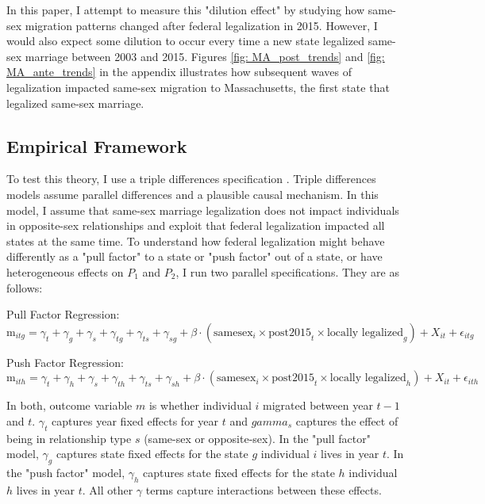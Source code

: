 \documentclass[12pt,letterpaper]{article}
\begin{document}
In this paper, I attempt to measure this "dilution effect" by studying how same-sex migration patterns changed after federal legalization in 2015. However, I would also expect some dilution to occur every time a new state legalized same-sex marriage between 2003 and 2015. Figures \ref{fig: MA_post_trends} and \ref{fig: MA_ante_trends} in the appendix illustrates how subsequent waves of legalization impacted same-sex migration to Massachusetts, the first state that legalized same-sex marriage.

\subsection{Empirical Framework}

To test this theory, I use a triple differences specification \citep{23, 24, 25}. Triple differences models assume parallel differences and a plausible causal mechanism. In this model, I assume that same-sex marriage legalization does not impact individuals in opposite-sex relationships and exploit that federal legalization impacted all states at the same time. To understand how federal legalization might behave differently as a "pull factor" to a state or "push factor" out of a state, or have heterogeneous effects on $P_1$ and $P_2$, I run two parallel specifications. They are as follows:

\hfill
\break
Pull Factor Regression:
\begin{equation}
\text{m}_{itg} = \gamma_t + \gamma_g + \gamma_s + \gamma_{tg} + \gamma_{ts} + \gamma_{sg} + \beta \cdot (\text{samesex}_i \times \text{post2015}_t \times \text{locally legalized}_g) 
+ X_{it} + \epsilon_{itg}
\end{equation}

\hfill
\break
Push Factor Regression:
\begin{equation}
\text{m}_{ith} = \gamma_t + \gamma_h + \gamma_s + \gamma_{th} + \gamma_{ts} + \gamma_{sh} + \beta \cdot (\text{samesex}_i \times \text{post2015}_t \times \text{locally legalized}_h) 
+ X_{it} + \epsilon_{ith}
\end{equation}

In both, outcome variable $m$ is whether individual $i$ migrated between year $t-1$ and $t$. $\gamma_t$ captures year fixed effects for year $t$ and $gamma_s$ captures the effect of being in relationship type $s$ (same-sex or opposite-sex). In the "pull factor" model, $\gamma_g$ captures state fixed effects for the state $g$ individual $i$ lives in year $t$. In the "push factor" model, $\gamma_h$ captures state fixed effects for the state $h$ individual $h$ lives in year $t$. All other $\gamma$ terms capture interactions between these effects. 
\end{document}
